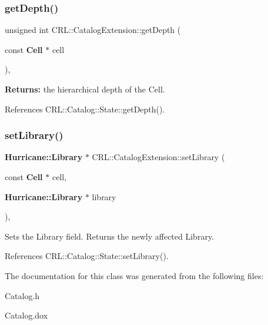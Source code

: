 \subsubsection{\texorpdfstring{get\+Depth()}{getDepth()}}
{\footnotesize\ttfamily unsigned int C\+R\+L\+::\+Catalog\+Extension\+::get\+Depth (\begin{DoxyParamCaption}\item[{const \textbf{ Cell} $\ast$}]{cell }\end{DoxyParamCaption})\hspace{0.3cm}{\ttfamily [inline]}, {\ttfamily [static]}}

{\bfseries Returns\+:} the hierarchical depth of the Cell. 

References C\+R\+L\+::\+Catalog\+::\+State\+::get\+Depth().

\mbox{\label{classCRL_1_1CatalogExtension_a6ef1b96f9bbbe39e13a5aba073f2394c}} 
\subsubsection{\texorpdfstring{set\+Library()}{setLibrary()}}
{\footnotesize\ttfamily \textbf{ Hurricane\+::\+Library} $\ast$ C\+R\+L\+::\+Catalog\+Extension\+::set\+Library (\begin{DoxyParamCaption}\item[{const \textbf{ Cell} $\ast$}]{cell,  }\item[{\textbf{ Hurricane\+::\+Library} $\ast$}]{library }\end{DoxyParamCaption})\hspace{0.3cm}{\ttfamily [inline]}, {\ttfamily [static]}}

Sets the Library field. Returns the newly affected Library. 

References C\+R\+L\+::\+Catalog\+::\+State\+::set\+Library().



The documentation for this class was generated from the following files\+:\begin{DoxyCompactItemize}
\item 
Catalog.\+h\item 
Catalog.\+dox\end{DoxyCompactItemize}
